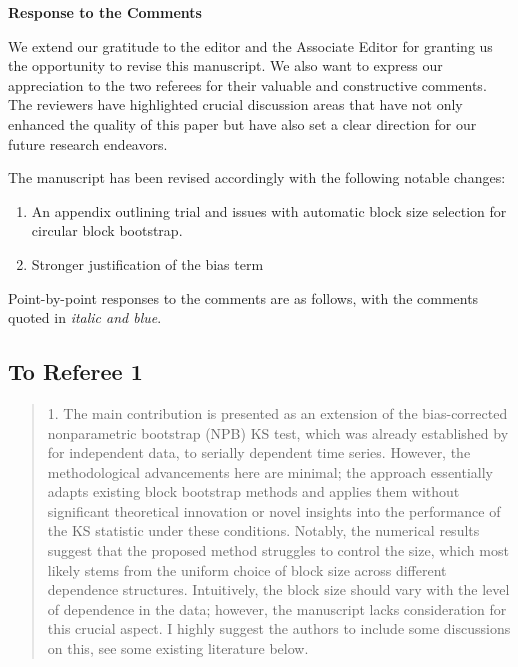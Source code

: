 \documentclass[12pt]{article}
\newenvironment{comment}%
{\begin{quotation}\noindent\small\it\color{darkblue}\ignorespaces%
}{\end{quotation}}
\begin{document}
\begin{center}
  {\Large\bf Response to the Comments}
\end{center}

We extend our gratitude to the editor and the Associate Editor for
granting us the opportunity to revise this manuscript. We also want to
express our appreciation to the two referees for their valuable and
constructive comments. The reviewers have highlighted crucial
discussion areas that have not only enhanced the quality of this paper
but have also set a clear direction for our future research
endeavors.


The manuscript has been
revised accordingly with the following notable changes:
\begin{enumerate}
\item An appendix outlining trial and issues with automatic block size selection
for circular block bootstrap.
\item Stronger justification of the bias term

\end{enumerate}


Point-by-point responses to the comments are as follows, with the
comments quoted in \emph{\color{darkblue} italic and blue}.

\subsection*{To Referee 1}

\begin{comment}
1. The main contribution is presented as an extension of the bias-corrected 
nonparametric
bootstrap (NPB) KS test, which was already established by 
\citet{babu2004goodness}
for independent data, to serially dependent time series. However, the 
methodological advancements
here are minimal; the approach essentially adapts existing block bootstrap 
methods and applies them without significant theoretical innovation or novel 
insights into the performance
of the KS statistic under these conditions. Notably, the numerical results 
suggest that the
proposed method struggles to control the size, which most likely stems from the 
uniform
choice of block size across different dependence structures. Intuitively, the 
block size should
vary with the level of dependence in the data; however, the manuscript lacks 
consideration
for this crucial aspect. I highly suggest the authors to include some 
discussions on this, see
some existing literature below.

\citep{hall1995blocking}

\citep{lahiri1999theoretical}

\citep{buhlmann2002bootstraps}

\citep{politis2004automatic}

\citep{lahiri2013resampling}

\end{comment}
\end{document}
